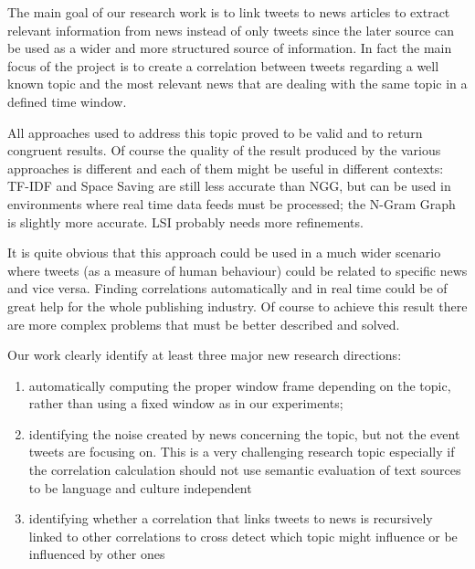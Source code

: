The main goal of our research work is to link tweets to news articles to extract relevant information from news 
instead of only tweets since the later source can be used as a wider and more structured source of information. 
In fact the main focus of the project is to create a correlation between tweets
regarding a well known topic and 
the most relevant news that are dealing with the same topic in a defined time window.
 
All approaches used to address this topic proved to be valid and to return congruent results. 
Of course the quality of the result produced by the various approaches is different and each of them
might be useful in different contexts: TF-IDF and Space Saving are still less
accurate than NGG, but can be used in environments where 
real time data feeds must be processed; the N-Gram Graph is slightly
more accurate. LSI probably needs more refinements.


It is quite obvious that this approach could be used in a much wider scenario where tweets (as a measure of 
human behaviour) could be related to specific news and vice versa. Finding correlations automatically and 
in real time could be of great help for the whole publishing industry. Of course to achieve this result there 
are more complex problems that must be better described and solved.

Our work clearly identify at least three major new research directions:
\begin{enumerate}
	\item automatically computing the proper window frame depending on the topic,
		rather than using a fixed window as in our experiments;
	\item identifying the noise created by news concerning the topic, but not the
		event tweets are focusing on. This is a very challenging research topic especially if the correlation calculation should not use semantic evaluation of text sources to be language and culture  independent 
	\item identifying whether a correlation that links tweets to news is recursively linked to other correlations to cross detect which topic might influence or be influenced by other ones
\end{enumerate}

%

